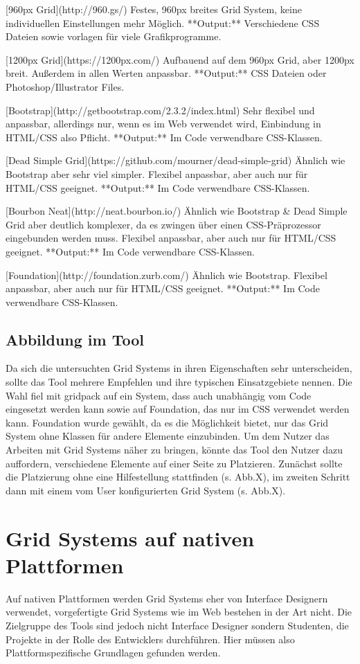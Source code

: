 [960px Grid](http://960.gs/)
Festes, 960px breites Grid System, keine individuellen Einstellungen mehr Möglich.
**Output:** Verschiedene CSS Dateien sowie vorlagen für viele Grafikprogramme.

[1200px Grid](https://1200px.com/)
Aufbauend auf dem 960px Grid, aber 1200px breit. Außerdem in allen Werten anpassbar.
**Output:** CSS Dateien oder Photoshop/Illustrator Files.

[Bootstrap](http://getbootstrap.com/2.3.2/index.html)
Sehr flexibel und anpassbar, allerdings nur, wenn es im Web verwendet wird, Einbindung in HTML/CSS also Pflicht.
**Output:** Im Code verwendbare CSS-Klassen.

[Dead Simple Grid](https://github.com/mourner/dead-simple-grid)
Ähnlich wie Bootstrap aber sehr viel simpler. Flexibel anpassbar, aber auch nur für HTML/CSS geeignet.
**Output:** Im Code verwendbare CSS-Klassen.

[Bourbon Neat](http://neat.bourbon.io/)
Ähnlich wie Bootstrap & Dead Simple Grid aber deutlich komplexer, da es zwingen über einen CSS-Präprozessor eingebunden werden muss. Flexibel anpassbar, aber auch nur für HTML/CSS geeignet.
**Output:** Im Code verwendbare CSS-Klassen.

[Foundation](http://foundation.zurb.com/)
Ähnlich wie Bootstrap. Flexibel anpassbar, aber auch nur für HTML/CSS geeignet.
**Output:** Im Code verwendbare CSS-Klassen.

\subsection{Abbildung im Tool}
Da sich die untersuchten Grid Systems in ihren Eigenschaften sehr unterscheiden, sollte das Tool mehrere Empfehlen und ihre typischen Einsatzgebiete nennen.
Die Wahl fiel mit gridpack auf ein System, dass auch unabhängig vom Code eingesetzt werden kann sowie auf Foundation, das nur im CSS verwendet werden kann. Foundation wurde gewählt, da es die Möglichkeit bietet, nur das Grid System ohne Klassen für andere Elemente einzubinden.
Um dem Nutzer das Arbeiten mit Grid Systems näher zu bringen, könnte das Tool den Nutzer dazu auffordern, verschiedene Elemente auf einer Seite zu Platzieren. Zunächst sollte die Platzierung ohne eine Hilfestellung stattfinden (s. Abb.X), im zweiten Schritt dann mit einem vom User konfigurierten Grid System (s. Abb.X).

\section{Grid Systems auf nativen Plattformen}
Auf nativen Plattformen werden Grid Systems eher von Interface Designern verwendet, vorgefertigte Grid Systems wie im Web bestehen in der Art nicht. Die Zielgruppe des Tools sind jedoch nicht Interface Designer sondern Studenten, die Projekte in der Rolle des Entwicklers durchführen. Hier müssen also Plattformspezifische Grundlagen gefunden werden.

